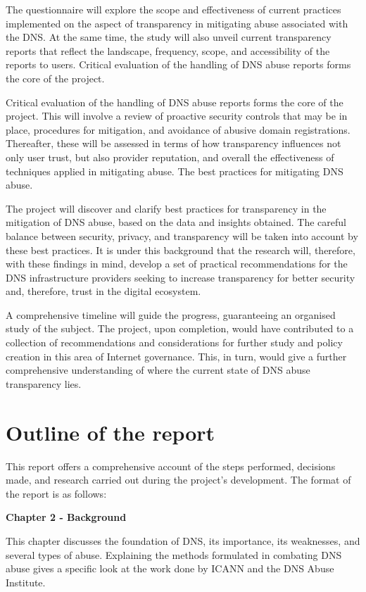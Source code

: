 The questionnaire will explore the scope and effectiveness of current practices implemented on the aspect of transparency in mitigating abuse associated with the DNS. At the same time, the study will also unveil current transparency reports that reflect the landscape, frequency, scope, and accessibility of the reports to users. Critical evaluation of the handling of DNS abuse reports forms the core of the project.

Critical evaluation of the handling of DNS abuse reports forms the core of the project. This will involve a review of proactive security controls that may be in place, procedures for mitigation, and avoidance of abusive domain registrations. Thereafter, these will be assessed in terms of how transparency influences not only user trust, but also provider reputation, and overall the effectiveness of techniques applied in mitigating abuse. The best practices for mitigating DNS abuse.

The project will discover and clarify best practices for transparency in the mitigation of DNS abuse, based on the data and insights obtained. The careful balance between security, privacy, and transparency will be taken into account by these best practices. It is under this background that the research will, therefore, with these findings in mind, develop a set of practical recommendations for the DNS infrastructure providers seeking to increase transparency for better security and, therefore, trust in the digital ecosystem.

A comprehensive timeline will guide the progress, guaranteeing an organised study of the subject. The project, upon completion, would have contributed to a collection of recommendations and considerations for further study and policy creation in this area of Internet governance. This, in turn, would give a further comprehensive understanding of where the current state of DNS abuse transparency lies.

\section{Outline of the report}

This report offers a comprehensive account of the steps performed, decisions made, and research carried out during the project's development. The format of the report is as follows:

\textbf{Chapter 2 - Background }

This chapter discusses the foundation of DNS, its importance, its weaknesses, and several types of abuse. Explaining the methods formulated in combating DNS abuse gives a specific look at the work done by ICANN and the DNS Abuse Institute.
\vspace{25px}

